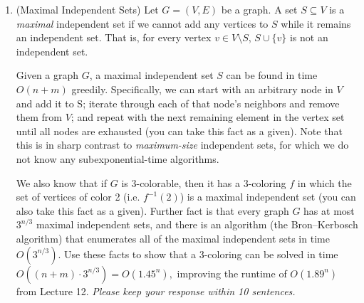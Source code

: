 \documentclass[11pt]{article}
\begin{document}
\begin{enumerate}
\begin{enumerate}
\begin{figure} [H]
    \end{figure}
\end{enumerate}

\item (Maximal Independent Sets) \label{prob:maximalIS} Let $G=(V,E)$ be a graph. A set $S\subseteq V$ is a {\em maximal} independent set if we cannot add any vertices to $S$ while it remains an independent set. That is, for every vertex $v\in V\setminus S$, $S\cup\{v\}$ is not an independent set.

Given a graph $G$, a maximal independent set $S$ can be found in time $O(n+m)$ greedily. Specifically, we can start with an arbitrary node in $V$ and add it to S; iterate through each of that node's neighbors and remove them from $V$; and repeat with the next remaining element in the vertex set until all nodes are exhausted (you can take this fact as a given). Note that this is in sharp contrast to {\em maximum-size} independent sets, for which we do not know any subexponential-time algorithms.

We also know that if $G$ is 3-colorable, then it has a 3-coloring $f$ in which the set of vertices of color 2 (i.e. $f^{-1}(2)$) is a maximal independent set (you can also take this fact as a given). Further fact is that every graph $G$ has at most $3^{n/3}$ maximal independent sets, and there is an algorithm (the Bron--Kerbosch algorithm) that enumerates all of the maximal independent sets in time $O(3^{n/3}).$ Use these facts to show that a 3-coloring can be solved in time $O((n+m)\cdot 3^{n/3}) = O(1.45^n),$ improving the runtime of $O(1.89^n)$ from Lecture 12. \emph{Please keep your response within 10 sentences.}


\end{enumerate}
\end{document}
